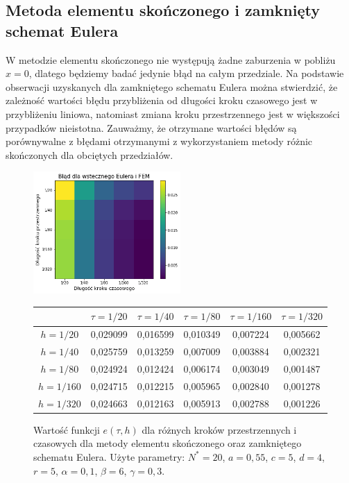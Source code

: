 \documentclass{article}
\begin{document}
\subsection{Metoda elementu skończonego i zamknięty schemat Eulera}
	W metodzie elementu skończonego nie występują żadne zaburzenia w pobliżu $x=0$, dlatego będziemy badać jedynie błąd na całym przedziale. Na podstawie obserwacji uzyskanych dla zamkniętego schematu Eulera można stwierdzić, że zależność wartości błędu przybliżenia od długości kroku czasowego jest w przybliżeniu liniowa, natomiast zmiana kroku przestrzennego jest w większości przypadków nieistotna. Zauważmy, że otrzymane wartości błędów są porównywalne z błędami otrzymanymi z wykorzystaniem metody różnic skończonych dla obciętych przedziałów.
	\begin{figure}[h!]
		\caption{Wartość funkcji $e(\tau,h)$ dla różnych kroków przestrzennych i czasowych dla metody elementu skończonego oraz zamkniętego schematu Eulera. Użyte parametry: $N^{*}=20$, $a=0,55$, $c=5$, $d=4$, $r=5$, $\alpha=0,1$, $\beta=6$, $\gamma=0,3$. }
		\centering
		\includegraphics[width=0.5\textwidth]{images/blad_fem_euler.pdf}
		\begin{tabular}{|c|c|c|c|c|c|}
			\hline
			&    $\tau=1/20$ &    $\tau=1/40$ &    $\tau=1/80$ &   $\tau=1/160$ &   $\tau=1/320$ \\
			\hline 
			$h=1/20$  &  0,029099 &  0,016599 &  0,010349 &  0,007224 &  0,005662 \\
			\hline
			$h=1/40$  &  0,025759 &  0,013259 &  0,007009 &  0,003884 &  0,002321 \\
			\hline
			$h=1/80$  &  0,024924 &  0,012424 &  0,006174 &  0,003049 &  0,001487 \\
			\hline
			$h=1/160$ &  0,024715 &  0,012215 &  0,005965 &  0,002840 &  0,001278 \\
			\hline
			$h=1/320$ &  0,024663 &  0,012163 &  0,005913 &  0,002788 &  0,001226 \\
			\hline
		\end{tabular}
	\end{figure}
\end{document}
